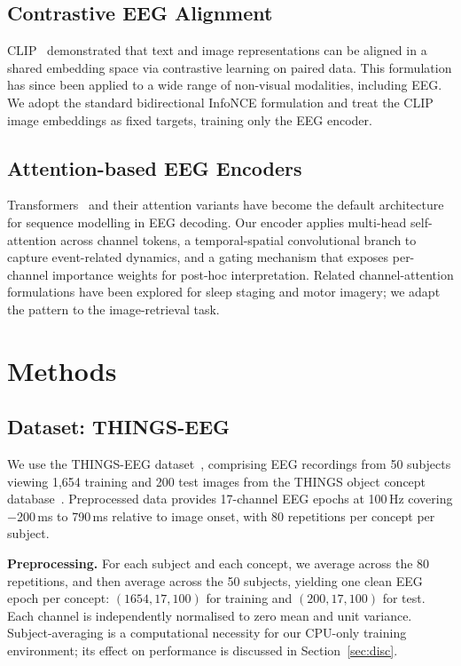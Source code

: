 \documentclass[conference]{IEEEtran}
\begin{document}
\subsection{Contrastive EEG Alignment}
CLIP~\cite{radford2021} demonstrated that
text and image representations can be aligned
in a shared embedding space via contrastive
learning on paired data. This formulation
has since been applied to a wide range of
non-visual modalities, including EEG. We
adopt the standard bidirectional InfoNCE
formulation and treat the CLIP image
embeddings as fixed targets, training only
the EEG encoder.

\subsection{Attention-based EEG Encoders}
Transformers~\cite{vaswani2017} and their
attention variants have become the default
architecture for sequence modelling in EEG
decoding. Our encoder applies multi-head
self-attention across channel tokens, a
temporal-spatial convolutional branch to
capture event-related dynamics, and a
gating mechanism that exposes per-channel
importance weights for post-hoc
interpretation. Related channel-attention
formulations have been explored for
sleep staging and motor imagery; we
adapt the pattern to the image-retrieval
task.

\section{Methods}

\subsection{Dataset: THINGS-EEG}
We use the THINGS-EEG dataset~\cite{gifford2022},
comprising EEG recordings from 50 subjects
viewing 1{,}654 training and 200 test images
from the THINGS object concept
database~\cite{things2019}. Preprocessed
data provides 17-channel EEG epochs at
100\,Hz covering $-$200\,ms to 790\,ms
relative to image onset, with 80 repetitions
per concept per subject.

\textbf{Preprocessing.}
For each subject and each concept, we average
across the 80 repetitions, and then average
across the 50 subjects, yielding one clean
EEG epoch per concept: $(1654, 17, 100)$ for
training and $(200, 17, 100)$ for test.
Each channel is independently normalised to
zero mean and unit variance. Subject-averaging
is a computational necessity for our CPU-only
training environment; its effect on
performance is discussed in
Section~\ref{sec:disc}.
\end{document}
